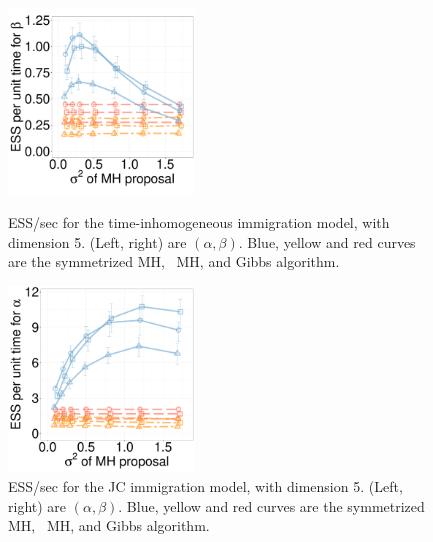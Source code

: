 \begin{figure}[H]
\begin{minipage}[!hp]{0.65\linewidth}
    \includegraphics [width=0.44\textwidth, angle=0]{figs/new_whole_exp_figs/cq_beta_dim5.pdf}
  \end{minipage}
  \begin{minipage}[!hp]{0.33\linewidth}
    \caption{ESS/sec for the time-inhomogeneous immigration model, with 
      dimension 5. (Left, right) are $(\alpha, \beta)$. Blue, yellow and red curves are the symmetrized MH,
  \naive\ MH, and Gibbs algorithm.}
     \label{fig:ESS_pc_55}
  \end{minipage}

  \begin{minipage}[!hp]{0.65\linewidth}
  \centering
    \includegraphics [width=0.44\textwidth, angle=0]{figs/new_whole_exp_figs/jc_alpha.pdf}
  \end{minipage}
  \begin{minipage}[!hp]{0.33\linewidth}
    \caption{ESS/sec for the JC immigration model, with 
      dimension 5. (Left, right) are $(\alpha, \beta)$. Blue, yellow and red curves are the symmetrized MH,
  \naive\ MH, and Gibbs algorithm.}
     \label{fig:ESS_pc_55}
  \end{minipage}


\end{figure}
